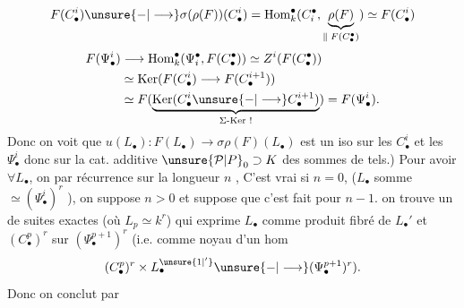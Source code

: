 \[
F(C_\bullet^i)\unsure{-|\longrightarrow}\sigma(\rho(F))(C_\bullet^i)
=\operatorname{Hom}_k^\bullet(C_i^\bullet,\underbrace{\rho(F)}_{\Vert\;F(C_\bullet^\bullet)})
\simeq F(C_\bullet^i)
\]
\[
\begin{aligned}
F(\Psi_\bullet^i)&\longrightarrow\operatorname{Hom}_k^\bullet(\Psi_i^\bullet,F(C_\bullet^\bullet))
\simeq Z^i(F(C_\bullet^\bullet))\\
&\simeq\operatorname{Ker}(F(C_\bullet^i)\longrightarrow F(C_\bullet^{i+1}))\\
&\simeq F(\underbrace{\operatorname{Ker}(C_\bullet^i\unsure{-|\longrightarrow}C_\bullet^{i+1})}_{\Sigma\text{-Ker !}})
=F(\Psi_\bullet^i).
\end{aligned}
\]
Donc on voit que $u(L_\bullet):F(L_\bullet)\longrightarrow\sigma\rho(F)(L_\bullet)$
est un iso sur les $C_\bullet^i$ et les $\Psi_\bullet^i$ donc
sur  la cat. additive $\unsure{\mathcal P|P}_0\supset K$ des sommes
de tels.) Pour avoir $\forall L_\bullet$, on 
par récurrence sur la longueur $n$ ,
C'est vrai si $n=0$, ($L_\bullet$ somme $\simeq(\Psi_\bullet^i)^r$
), on
suppose $n>0$ et suppose que c'est fait pour
$n-1$.
on trouve un  de suites exactes (où $L_p\simeq k^r$)
qui exprime $L_\bullet$ comme produit fibré
de $L_\bullet'$ et $(C_\bullet^p)^r$ sur $(\Psi_\bullet^{p+1})^r$ (i.e. comme
noyau d'un hom 
\[
(C_\bullet^p)^r\times L_\bullet^{\unsure{1|'}}\unsure{-|\longrightarrow}(\Psi_\bullet^{p+1})^r).
\]
Donc on conclut par

